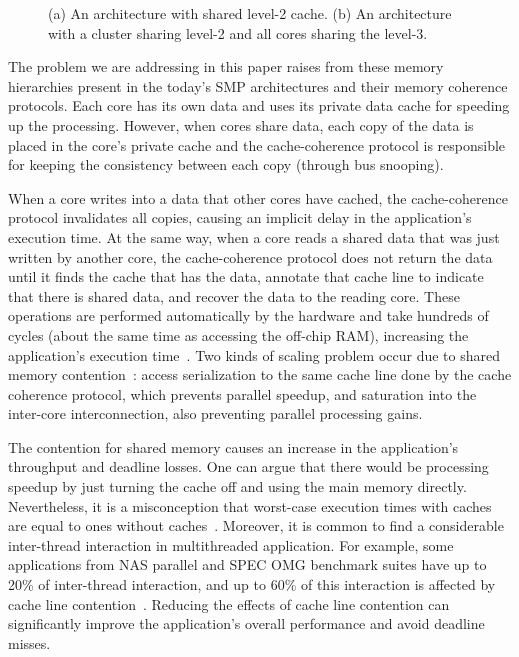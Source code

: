 \documentclass[conference]{IEEEtran}
\begin{document}
\begin{figure}[htb]
{\label{fig:cache2}
}
\caption{(a) An architecture with shared level-2 cache. (b) An architecture with a cluster sharing level-2 and all cores sharing the level-3.}
\label{fig:caches}
\end{figure}

The problem we are addressing in this paper raises from these memory hierarchies present in the today's SMP architectures and their memory coherence protocols. Each core has its own data and uses its private data cache for speeding up the processing. However, when cores share data, each copy of the data is placed in the core's private cache and the cache-coherence protocol is responsible for keeping the consistency between each copy (through bus snooping).

When a core writes into a data that other cores have cached, the cache-coherence protocol invalidates all copies, causing an implicit delay in the application's execution time. At the same way, when a core reads a shared data that was just written by another core, the cache-coherence protocol does not return the data until it finds the cache that has the data, annotate that cache line to indicate that there is shared data, and recover the data to the reading core. These operations are performed automatically by the hardware and take hundreds of cycles (about the same time as accessing the off-chip RAM), increasing the application's execution time~\cite{BoydWickizer:10}. Two kinds of scaling problem occur due to shared memory contention~\cite{BoydWickizer:10}: access serialization to the same cache line done by the cache coherence protocol, which prevents parallel speedup, and saturation into the inter-core interconnection, also preventing parallel processing gains.

The contention for shared memory causes an increase in the application's throughput and deadline losses. One can argue that there would be processing speedup by just turning the cache off and using the main memory directly. Nevertheless, it is a misconception that worst-case execution times with caches are equal to ones without caches~\cite{Liedtke:1997}. Moreover, it is common to find a considerable inter-thread interaction in multithreaded application. For example, some applications from NAS parallel and SPEC OMG benchmark suites have up to 20\% of inter-thread interaction, and up to 60\% of this interaction is affected by cache line contention~\cite{Muralidhara:2010}. Reducing the effects of cache line contention can significantly improve the application's overall performance and avoid deadline misses. 
\end{document}
